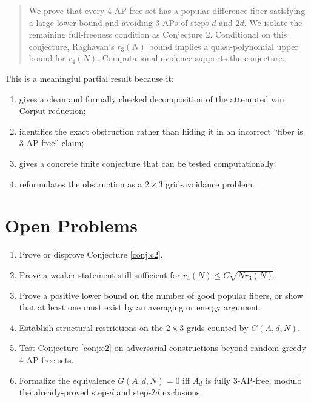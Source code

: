 \documentclass[11pt]{article}
\begin{document}
\begin{quote}
We prove that every 4-AP-free set has a popular difference fiber satisfying a
large lower bound and avoiding 3-APs of steps \(d\) and \(2d\).  We isolate the
remaining full-freeness condition as Conjecture 2.  Conditional on this
conjecture, Raghavan's \(r_3(N)\) bound implies a quasi-polynomial upper bound
for \(r_4(N)\).  Computational evidence supports the conjecture.
\end{quote}

This is a meaningful partial result because it:
\begin{enumerate}
  \item gives a clean and formally checked decomposition of the attempted van
  Corput reduction;
  \item identifies the exact obstruction rather than hiding it in an incorrect
  ``fiber is 3-AP-free'' claim;
  \item gives a concrete finite conjecture that can be tested computationally;
  \item reformulates the obstruction as a \(2\times3\) grid-avoidance problem.
\end{enumerate}

\section{Open Problems}

\begin{enumerate}
  \item Prove or disprove Conjecture \ref{conj:c2}.
  \item Prove a weaker statement still sufficient for
  \(r_4(N)\leq C\sqrt{N r_3(N)}\).
  \item Prove a positive lower bound on the number of good popular fibers, or
  show that at least one must exist by an averaging or energy argument.
  \item Establish structural restrictions on the \(2\times3\) grids counted by
  \(G(A,d,N)\).
  \item Test Conjecture \ref{conj:c2} on adversarial constructions beyond random
  greedy 4-AP-free sets.
  \item Formalize the equivalence \(G(A,d,N)=0\) iff \(A_d\) is fully 3-AP-free,
  modulo the already-proved step-\(d\) and step-\(2d\) exclusions.
\end{enumerate}
\end{document}
